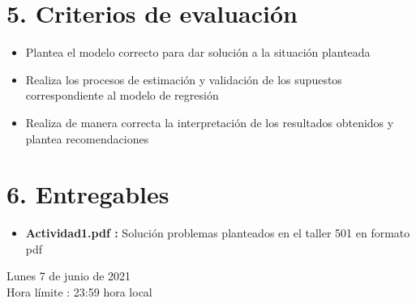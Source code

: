 \documentclass[base=hide,11pt]{elegantbook}
\begin{document}
\section*{5. Criterios de evaluación}

\begin{itemize}
	\item Plantea el modelo correcto para dar solución a la situación planteada	
	\item Realiza los procesos de estimación y validación de los supuestos correspondiente al modelo de regresión 
	\item Realiza de manera correcta la interpretación de los resultados obtenidos y plantea recomendaciones 
\end{itemize}


\section*{6. Entregables}

\begin{itemize}
\item \textcolor{col3}{\bf Actividad1.pdf :} Solución problemas planteados en el taller 501 en formato pdf 
\end{itemize}
\vspace{1cm}

Lunes 7 de junio de 2021\\
Hora límite : 23:59  hora  local


\end{document}
